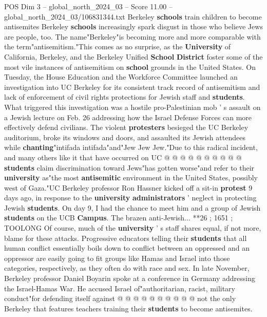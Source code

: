 \begin{textsample}{POS Dim 3 – global\_north\_2024\_03 – Score 11.00 – global\_north\_2024\_03/106831344.txt}  \label{ex:f3_pos_295}
Berkeley \textbf{schools} train children to become antisemites Berkeley \textbf{schools} increasingly spark disgust in those who believe Jews are people, too.
The name"Berkeley"is becoming more and more comparable with the term"antisemitism."This comes as no surprise, as the \textbf{University} of California, Berkeley, and the Berkeley Unified \textbf{School} \textbf{District} foster some of the most vile instances of antisemitism on \textbf{school} grounds in the United States.
On Tuesday, the House Education and the Workforce Committee launched an investigation into UC Berkeley for its consistent track record of antisemitism and lack of enforcement of civil rights protections for Jewish staff and \textbf{students}.
What triggered this investigation was a hostile pro-Palestinian mob ' s assault on a Jewish lecture on Feb. 26 addressing how the Israel Defense Forces can more effectively defend civilians.
The violent \textbf{protesters} besieged the UC Berkeley auditorium, broke its windows and doors, and assaulted its Jewish attendees while \textbf{chanting}"intifada intifada"and"Jew Jew Jew."Due to this radical incident, and many others like it that have occurred on UC @ @ @ @ @ @ @ @ @ @ \textbf{students} claim discrimination toward Jews"has gotten worse"and refer to their \textbf{university} as"the most \textbf{antisemitic} environment in the United States, possibly west of Gaza."UC Berkeley professor Ron Hassner kicked off a sit-in \textbf{protest} 9 days ago, in response to the \textbf{university} \textbf{administrators} ' neglect in protecting Jewish \textbf{students}.
On day 9, I had the chance to meet him and a group of Jewish \textbf{students} on the UCB \textbf{Campus}.
The brazen anti-Jewish... **26 ; 1651 ; TOOLONG Of course, much of the \textbf{university} ' s staff shares equal, if not more, blame for these attacks.
Progressive educators telling their \textbf{students} that all human conflict essentially boils down to conflict between an oppressed and an oppressor are easily going to fit groups like Hamas and Israel into those categories, respectively, as they often do with race and sex.
In late November, Berkeley professor Daniel Boyarin spoke at a conference in Germany addressing the Israel-Hamas War.
He accused Israel of"authoritarian, racist, military conduct"for defending itself against @ @ @ @ @ @ @ @ @ @ not the only Berkeley that features teachers training their \textbf{students} to become antisemites.

\end{textsample}
